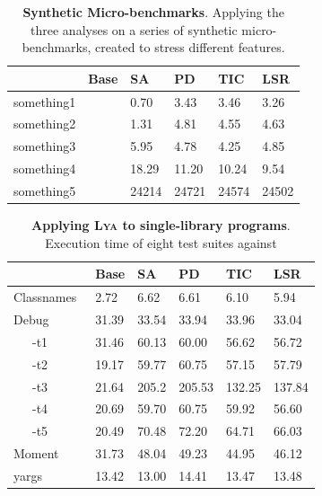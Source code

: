 \documentclass[letterpaper,twocolumn,10pt]{article}
\newcommand{\sys}{{\scshape Lya}\xspace}
\newcommand{\fixme}[1]{{\color{red}#1}}
\begin{document}
\begin{table}[t]
\center
\footnotesize
\setlength\tabcolsep{3pt}
\caption{
  \footnotesize{
    \textbf{Synthetic Micro-benchmarks}.
		Applying the three analyses on a series of synthetic micro-benchmarks, created to stress different features.
  }
}
\begin{tabular*}{\columnwidth}{l @{\extracolsep{\fill}} ll lll}
\toprule
              &   Base    &  SA     & PD       &   TIC    &   LSR     \\
\midrule
something1    &           &  0.70   &    3.43  &   3.46   &   3.26    \\
something2    &           &  1.31   &    4.81  &   4.55   &   4.63    \\
something3    &           &  5.95   &    4.78  &   4.25   &   4.85    \\
something4    &           &  18.29  &   11.20  &   10.24  &   9.54    \\
something5    &           &  24214  &   24721  &   24574  &   24502   \\
\bottomrule
\end{tabular*}
\label{tab:synthetic}
\vspace{-5mm}
\end{table}

\begin{table}[t]
\center
\footnotesize
\setlength\tabcolsep{3pt}
\caption{
  \footnotesize{
    \textbf{Applying \sys to single-library programs}.
		\fixme{Execution time of eight test suites against }
  }
}
\begin{tabular*}{\columnwidth}{l @{\extracolsep{\fill}} ll lll}
\toprule
                    & Base   &  SA   & PD     &   TIC   & LSR     \\
\midrule
Classnames~\cite{}  &  2.72  & 6.62  &  6.61  &  6.10   & 5.94    \\
Debug~\cite{}       & 31.39  & 33.54 &  33.94 &  33.96  & 33.04   \\
~~~-t1              & 31.46  & 60.13 &  60.00 &  56.62  & 56.72   \\
~~~-t2              & 19.17  & 59.77 &  60.75 &  57.15  & 57.79   \\
~~~-t3              & 21.64  & 205.2 &  205.53&  132.25 & 137.84  \\
~~~-t4              & 20.69  & 59.70 &  60.75 &  59.92  & 56.60   \\
~~~-t5              & 20.49  & 70.48 &  72.20 &  64.71  & 66.03   \\
Moment~\cite{}      & 31.73  & 48.04 &  49.23 &  44.95  & 46.12   \\
yargs~\cite{}       & 13.42  & 13.00 &  14.41 &  13.47  & 13.48   \\
\bottomrule
\end{tabular*}
\label{tab:meso}
\vspace{-5mm}
\end{table}
\end{document}
